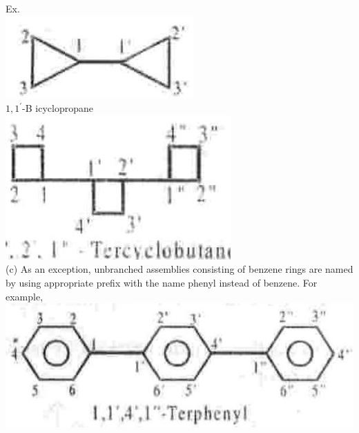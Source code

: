 \documentclass[10pt]{article}
\begin{document}
Ex.\\
\includegraphics[max width=\textwidth, center]{2025_01_28_8470952b98110cec3aabg-036(5)}\\
$1,1^{\prime}$-B icyclopropane\\
\includegraphics[max width=\textwidth, center]{2025_01_28_8470952b98110cec3aabg-036(1)}\\
(c) As an exception, unbranched assemblies consisting of benzene rings are named by using appropriate prefix with the name phenyl instead of benzene. For example,\\
\includegraphics[max width=\textwidth, center]{2025_01_28_8470952b98110cec3aabg-036(4)}
\end{document}
